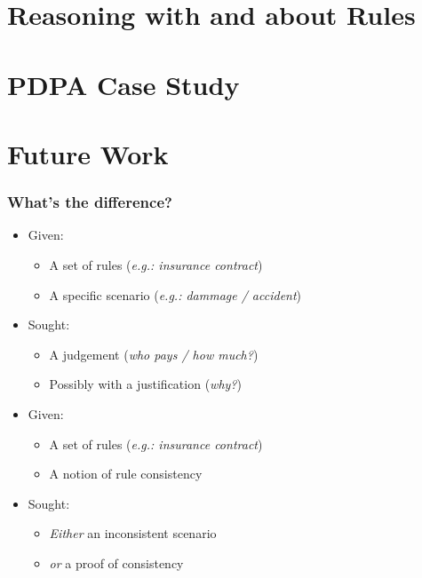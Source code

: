 \documentclass{beamer}
\begin{document}
\section{Reasoning with and about Rules}




\section{PDPA Case Study}



\section{Future Work}



\begin{frame}[fragile]\frametitle{What's the difference?}

  \begin{itemize}
  \item Given:
    \begin{itemize}
    \item A set of rules  (\emph{e.g.: insurance contract})
    \item A specific scenario (\emph{e.g.: dammage / accident})
    \end{itemize}
  \item Sought:
    \begin{itemize}
    \item A judgement (\emph{who pays / how much?})
    \item Possibly with a justification (\emph{why?})
    \end{itemize}
  \end{itemize}

  \vspace{4mm}
  \begin{itemize}
  \item Given:
    \begin{itemize}
    \item A set of rules  (\emph{e.g.: insurance contract})
    \item A notion of rule consistency
    \end{itemize}
  \item Sought:
    \begin{itemize}
    \item \emph{Either} an inconsistent scenario 
    \item \emph{or} a proof of consistency
    \end{itemize}
  \end{itemize}


\end{frame}
\end{document}
